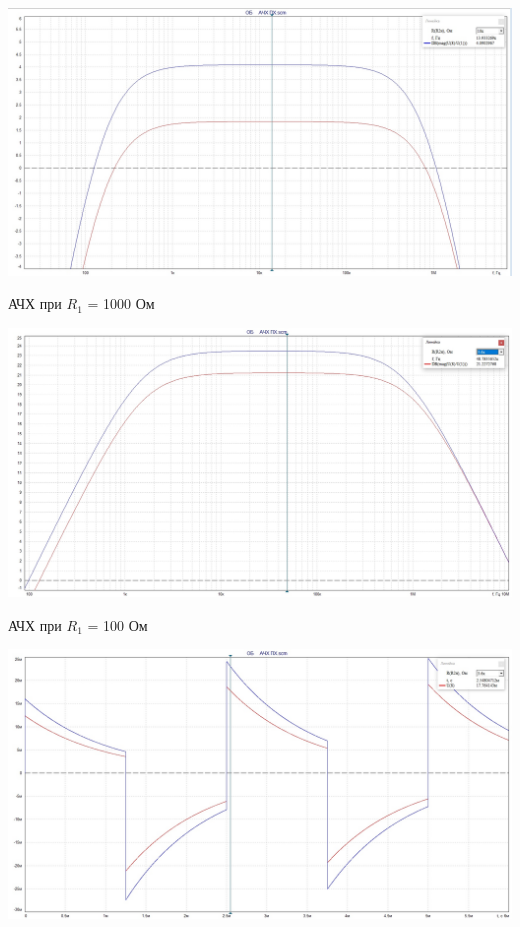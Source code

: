 \documentclass[a4paper,14pt]{extarticle}
\begin{document}
    \begin{center}
        \includegraphics[scale=0.3]{5.1.jpg}
    \end{center}

    АЧХ при $R_1$ = 1000 Ом

     \begin{center}
         \includegraphics[scale=0.3]{5.2.jpg}
     \end{center}

    АЧХ при $R_1$ = 100 Ом

    \begin{center}
        \includegraphics[scale=0.3]{5.3.jpg}
    \end{center}
\end{document}
